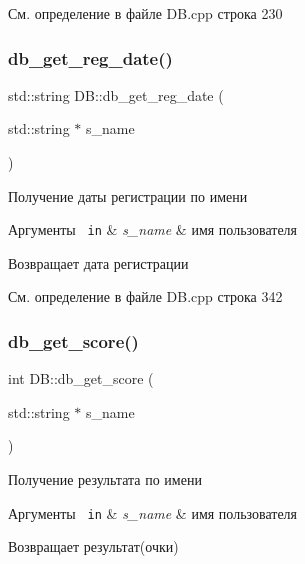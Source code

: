 См. определение в файле D\+B.\+cpp строка 230

\mbox{\label{group__dbcpp_gad7c6310d2669acd40978fd4662f90d53}} 
\subsubsection{\texorpdfstring{db\_get\_reg\_date()}{db\_get\_reg\_date()}}
{\footnotesize\ttfamily std\+::string D\+B\+::db\+\_\+get\+\_\+reg\+\_\+date (\begin{DoxyParamCaption}\item[{std\+::string $\ast$}]{s\+\_\+name }\end{DoxyParamCaption})}



Получение даты регистрации по имени 


\begin{DoxyParams}[1]{Аргументы}
\mbox{\texttt{ in}}  & {\em s\+\_\+name} & имя пользователя \\
\hline
\end{DoxyParams}
\begin{DoxyReturn}{Возвращает}
дата регистрации 
\end{DoxyReturn}


См. определение в файле D\+B.\+cpp строка 342

\mbox{\label{group__dbcpp_ga990cefb97ea7222649511f37334a8601}} 
\subsubsection{\texorpdfstring{db\_get\_score()}{db\_get\_score()}}
{\footnotesize\ttfamily int D\+B\+::db\+\_\+get\+\_\+score (\begin{DoxyParamCaption}\item[{std\+::string $\ast$}]{s\+\_\+name }\end{DoxyParamCaption})}



Получение результата по имени 


\begin{DoxyParams}[1]{Аргументы}
\mbox{\texttt{ in}}  & {\em s\+\_\+name} & имя пользователя \\
\hline
\end{DoxyParams}
\begin{DoxyReturn}{Возвращает}
результат(очки) 
\end{DoxyReturn}


